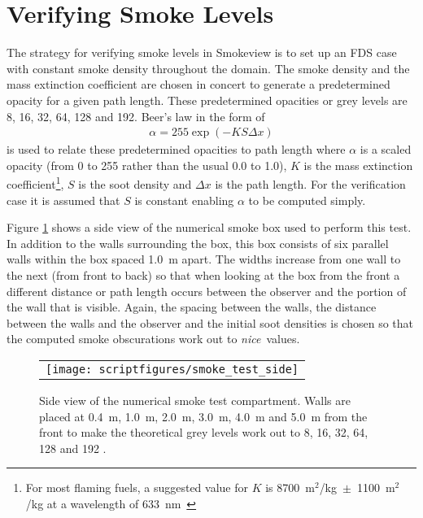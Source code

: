 \documentclass[11pt,twoside]{book}
\newcommand{\figoptions}{hbp}
\begin{document}
\section{Verifying Smoke Levels}
The strategy for verifying smoke levels in Smokeview is to set up an FDS case with constant smoke density throughout the domain.  The smoke density and the mass extinction coefficient are chosen in concert to generate a predetermined opacity for a given path length.   These predetermined opacities or grey levels are 8, 16, 32, 64, 128 and 192.  Beer's law in the form of
\begin{eqnarray*}
\alpha = 255\exp(-KS\Delta x)
\end{eqnarray*}
is used to relate these predetermined opacities to path length where $\alpha$ is a scaled opacity (from 0 to 255 rather than the usual 0.0 to 1.0),
$K$ is the mass extinction coefficient\footnote{For most flaming fuels, a suggested value for $K$ is
8700~m$^2$/kg~$\pm$~1100~m$^2$/kg at a
wavelength of 633~nm~\cite{Mulholland:F+M}},
$S$ is the soot density and $\Delta x$ is the path length.  For the verification case it is assumed that $S$ is constant enabling $\alpha$ to be computed simply.

Figure \ref{figsmoketestgeom} shows a side view of the numerical smoke box used to perform this test.  In addition to the walls surrounding the box, this box consists of  six parallel walls within the box spaced 1.0~m apart.  The widths increase from one wall to the next (from front to back) so that when looking at the box from the front a different distance or path length occurs between the observer and the portion of the wall that is visible.  Again, the spacing between the walls, the distance between the walls and the observer and the initial soot densities is chosen so that the computed smoke obscurations work out to {\em nice}\ values.

\begin{figure}[\figoptions]
\begin{center}
 \centering
\begin{tabular}{c}
 \texttt{[image: scriptfigures/smoke\_test\_side]}
 \end{tabular}
\end{center}
 \caption[Side view of numerical smoke test compartment.]{Side view of the numerical smoke test compartment.  Walls are placed at 0.4~m, 1.0~m, 2.0~m, 3.0~m, 4.0~m and 5.0~m from the front to make the theoretical grey levels work out to 8, 16, 32, 64, 128 and 192 .}
\label{figsmoketestgeom}%
\end{figure}
\end{document}
